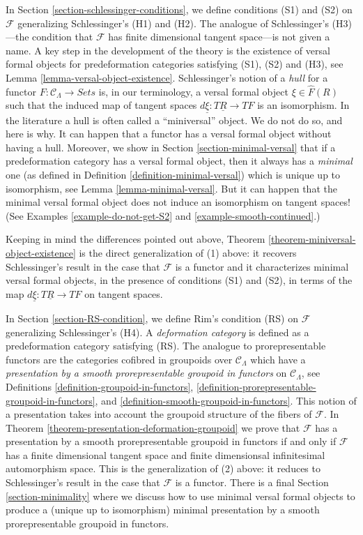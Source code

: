 \medskip\noindent
In
Section \ref{section-schlessinger-conditions},
we define conditions (S1) and (S2) on $\mathcal{F}$ generalizing
Schlessinger's (H1) and (H2). The analogue of Schlessinger's
(H3)---the condition that $\mathcal{F}$ has finite dimensional
tangent space---is not given a name.
A key step in the development of the theory is the existence of
versal formal objects for predeformation categories satisfying
(S1), (S2) and (H3), see
Lemma \ref{lemma-versal-object-existence}.
Schlessinger's notion of a {\it hull} for a functor
$F : \mathcal{C}_\Lambda \to \textit{Sets}$
is, in our terminology, a versal formal object $\xi \in \widehat{F}(R)$
such that the induced map of tangent spaces
$d\underline{\xi} : T\underline{R} \to TF$ is an isomorphism.
In the literature a hull is often called a ``miniversal'' object.
We do not do so, and here is why. It can happen that a functor has a
versal formal object without having a hull. Moreover, we show in
Section \ref{section-minimal-versal}
that if a predeformation category has a versal formal object, then
it always has a {\it minimal} one (as defined in
Definition \ref{definition-minimal-versal})
which is unique up to isomorphism, see
Lemma \ref{lemma-minimal-versal}.
But it can happen that the minimal versal formal object does not
induce an isomorphism on tangent spaces! (See
Examples \ref{example-do-not-get-S2} and
\ref{example-smooth-continued}.)

\medskip\noindent
Keeping in mind the differences pointed out above,
Theorem \ref{theorem-miniversal-object-existence}
is the direct generalization of (1) above: it recovers Schlessinger's
result in the case that $\mathcal{F}$ is a functor and it characterizes
minimal versal formal objects, in the presence of conditions
(S1) and (S2), in terms of the map $d\underline{\xi} : T\underline{R} \to TF$
on tangent spaces.

\medskip \noindent
In Section \ref{section-RS-condition},
we define Rim's condition (RS) on $\mathcal{F}$ generalizing
Schlessinger's (H4). A {\it deformation category} is defined as a
predeformation category satisfying (RS).
The analogue to prorepresentable functors are the categories
cofibred in groupoids over $\mathcal{C}_\Lambda$ which have
a {\it presentation by a smooth prorepresentable groupoid in functors}
on $\mathcal{C}_\Lambda$, see
Definitions \ref{definition-groupoid-in-functors},
\ref{definition-prorepresentable-groupoid-in-functors}, and
\ref{definition-smooth-groupoid-in-functors}.
This notion of a presentation takes into account the groupoid structure
of the fibers of $\mathcal{F}$. In
Theorem \ref{theorem-presentation-deformation-groupoid}
we prove that $\mathcal{F}$ has a presentation by a smooth prorepresentable
groupoid in functors if and only if $\mathcal{F}$ has a finite dimensional
tangent space and finite dimensionsal infinitesimal automorphism space.
This is the generalization of (2) above: it reduces to Schlessinger's result
in the case that $\mathcal{F}$ is a functor.
There is a final
Section \ref{section-minimality}
where we discuss how to use minimal versal formal objects
to produce a (unique up to isomorphism) minimal presentation
by a smooth prorepresentable groupoid in functors.

